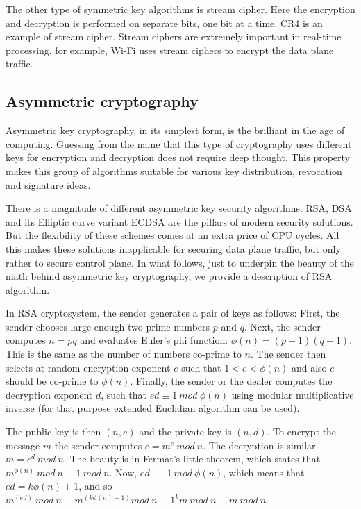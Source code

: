 The other type of symmetric key algorithms is stream cipher. Here the encryption 
and decryption is performed on separate bits, one bit at a time. CR4 is an example 
of stream cipher. Stream ciphers are extremely important in real-time processing, 
for example, Wi-Fi uses stream ciphers to encrypt the data plane traffic.

\subsection{Asymmetric cryptography}

Asymmetric key cryptography, in its simplest form, is the brilliant in the age 
of computing. Guessing from the name that this type of cryptography uses different 
keys for encryption and decryption does not require deep thought. This property makes 
this group of algorithms suitable for various key distribution, revocation and 
signature ideas. 

There is a magnitude of different asymmetric key security algorithms. 
RSA, DSA and its Elliptic curve variant ECDSA are the pillars of modern 
security solutions. But the flexibility of these schemes comes at an extra 
price of CPU cycles. All this makes these solutions inapplicable for securing 
data plane traffic, but only rather to secure control plane. In what follows, 
just to underpin the beauty of the math behind asymmetric key cryptography, 
we provide a description of RSA algorithm.

In RSA cryptosystem, the sender generates a pair of keys as follows: 
First, the sender chooses large enough two prime numbers $p$ and $q$. Next, 
the sender computes $n=pq$ and evaluates Euler’s phi function: $\phi(n)=(p-1)(q-1)$. 
This is the same as the number of numbers co-prime to $n$. The sender then selects at 
random encryption exponent $e$ such that $1<e<\phi(n)$ and also $e$ should be co-prime to $\phi(n)$.
Finally, the sender or the dealer computes the decryption exponent $d$, such that 
$ed \equiv 1\ mod\ \phi(n)$ using modular multiplicative inverse (for that purpose extended Euclidian 
algorithm can be used).

The public key is then $(n, e)$ and the private key is $(n, d)$. To encrypt the message $m$ 
the sender computes $c= m^e\ mod\ n$. The decryption is similar $m = c^d\ mod\ n$. The beauty is 
in Fermat’s little theorem, which states that $m^{\phi(n)}\ mod\ n \equiv 1\ mod\ n$. 
Now, $ed\ \equiv\ 1\ mod\ \phi(n)$, which means that 
$ed=k\phi(n)+1$, and so $m^{(ed)}\ mod\ n \equiv m^{(k\phi(n)+1)} mod\ n \equiv 1^k m\ mod\ n \equiv m\ mod\ n$. 

